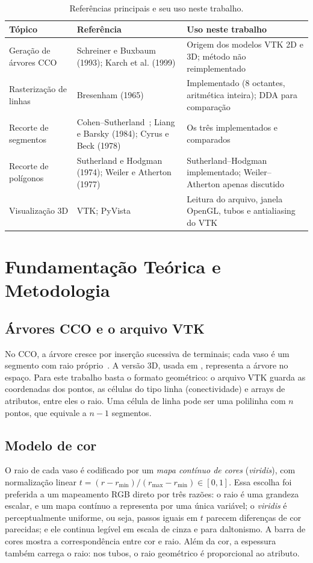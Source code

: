 \documentclass[11pt, a4paper]{article}
\begin{document}
\begin{table}[htbp]
  \centering
  \small
  \caption{Referências principais e seu uso neste trabalho.}
  \label{tab:relacionados}
  \begin{tabularx}{\textwidth}{l X X}
    \toprule
    \textbf{Tópico} & \textbf{Referência} & \textbf{Uso neste trabalho} \\
    \midrule
    Geração de árvores CCO & Schreiner e Buxbaum (1993); Karch et al. (1999) & Origem dos modelos VTK 2D e 3D; método não reimplementado \\
    Rasterização de linhas & Bresenham (1965) & Implementado (8 octantes, aritmética inteira); DDA para comparação \\
    Recorte de segmentos & Cohen--Sutherland~\cite{foley1990}; Liang e Barsky (1984); Cyrus e Beck (1978) & Os três implementados e comparados \\
    Recorte de polígonos & Sutherland e Hodgman (1974); Weiler e Atherton (1977) & Sutherland--Hodgman implementado; Weiler--Atherton apenas discutido \\
    Visualização 3D & VTK; PyVista & Leitura do arquivo, janela OpenGL, tubos e antialiasing do VTK \\
    \bottomrule
  \end{tabularx}
\end{table}


\section{Fundamentação Teórica e Metodologia}

\subsection{Árvores CCO e o arquivo VTK}
No CCO, a árvore cresce por inserção sucessiva de terminais; cada vaso é um
segmento com raio próprio~\cite{schreiner1993}. A versão 3D, usada em
\cite{karch1999}, representa a árvore no espaço. Para este trabalho basta o
formato geométrico: o arquivo VTK guarda as coordenadas dos pontos, as células do
tipo linha (conectividade) e arrays de atributos, entre eles o raio. Uma célula
de linha pode ser uma polilinha com $n$ pontos, que equivale a $n-1$ segmentos.

\subsection{Modelo de cor}\label{sec:cor}
O raio de cada vaso é codificado por um \emph{mapa contínuo de cores} (\emph{viridis}),
com normalização linear $t=(r-r_{\min})/(r_{\max}-r_{\min})\in[0,1]$. Essa escolha
foi preferida a um mapeamento RGB direto por três razões: o raio é uma grandeza
escalar, e um mapa contínuo a representa por uma única variável; o \emph{viridis} é
perceptualmente uniforme, ou seja, passos iguais em $t$ parecem diferenças de cor
parecidas; e ele continua legível em escala de cinza e para daltonismo. A barra de
cores mostra a correspondência entre cor e raio. Além da cor, a espessura também
carrega o raio: nos tubos, o raio geométrico é proporcional ao atributo.
\end{document}
